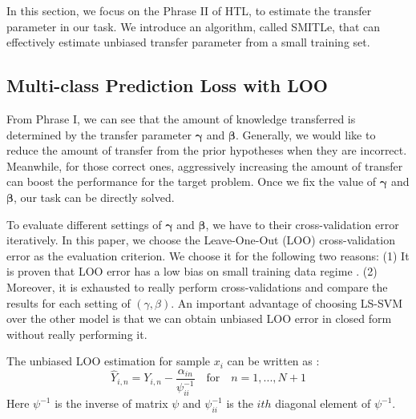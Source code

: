 In this section, we focus on the Phrase II of HTL, to estimate the transfer parameter in our task. We introduce an algorithm, called SMITLe, that can effectively estimate unbiased transfer parameter from a small training set. %

\subsection{Multi-class Prediction Loss with LOO}

From Phrase I, we can see that the amount of knowledge transferred is determined by the transfer parameter $\boldsymbol{\gamma}$ and $\boldsymbol{\beta}$. Generally, we would like to reduce the amount of transfer from the prior hypotheses when they are incorrect. Meanwhile, for those correct ones, aggressively increasing the amount of transfer can boost the performance for the target problem. Once we fix the value of $\boldsymbol{\gamma}$ and $\boldsymbol{\beta}$, our task can be directly solved.

To evaluate different settings of $\boldsymbol{\gamma}$ and $\boldsymbol{\beta}$, we have to their cross-validation error iteratively. In this paper, we choose the Leave-One-Out (LOO) cross-validation error as the evaluation criterion. We choose it for the following two reasons: (1) It is proven that LOO error has a low bias on small training data regime \cite{kuzborskij2013stability}. (2) Moreover, it is exhausted to really perform cross-validations and compare the results for each setting of $(\gamma,\beta)$. An important advantage of choosing LS-SVM over the other model is that we can obtain unbiased LOO error in closed form without really performing it. 

The unbiased LOO estimation for sample $x_i$ can be written as \cite{cawley2006leave}:
\begin{equation}
{\hat Y_{i,n}} = {Y_{i,n}} - \frac{{{\alpha _{in}}}}{{\psi_{ii}^{ - 1}}}\quad {\text{for}}\quad n = 1,...,N + 1
\end{equation}
Here $\psi^{-1}$ is the inverse of matrix $\psi$ and  $\psi_{ii}^{-1}$ is the $ith$ diagonal element of $\psi^{-1}$. 

